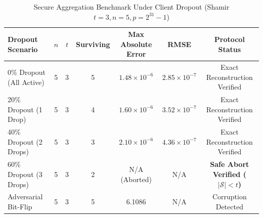 \begin{table}[t]
\centering
\caption{Secure Aggregation Benchmark Under Client Dropout (Shamir $t=3, n=5, p=2^{31}-1$)}
\label{tab:secure_aggregation}
\begin{tabular}{lcccccc}
\hline
\textbf{Dropout Scenario} & $n$ & $t$ & \textbf{Surviving} & \textbf{Max Absolute Error} & \textbf{RMSE} & \textbf{Protocol Status} \\
\hline
0\% Dropout (All Active) & 5 & 3 & 5 & $1.48 \times 10^{-6}$ & $2.85 \times 10^{-7}$ & Exact Reconstruction Verified \\
20\% Dropout (1 Drop) & 5 & 3 & 4 & $1.60 \times 10^{-6}$ & $3.52 \times 10^{-7}$ & Exact Reconstruction Verified \\
40\% Dropout (2 Drops) & 5 & 3 & 3 & $2.10 \times 10^{-6}$ & $4.36 \times 10^{-7}$ & Exact Reconstruction Verified \\
60\% Dropout (3 Drops) & 5 & 3 & 2 & N/A (Aborted) & N/A & \textbf{Safe Abort Verified ($|\mathcal{S}| < t$)} \\
Adversarial Bit-Flip & 5 & 3 & 5 & 6.1086 & N/A & Corruption Detected \\
\hline
\end{tabular}
\end{table}
